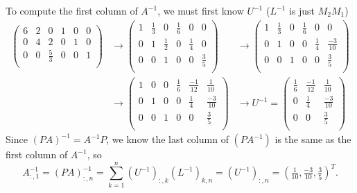 \documentclass[11pt]{article}
\begin{document}
\begin{enumerate}
\begin{enumerate}
		            To compute the first column of \(A^{-1}\), we must first know \(U^{-1}\) (\(L^{-1}\) is just \(M_2 M_1\))
		            \begin{align*}
			            \left(\begin{array}{rrr|rrr}
					                  6 & 2 & 0        & 1 & 0 & 0 \\
					                  0 & 4 & 2        & 0 & 1 & 0 \\
					                  0 & 0 & \tfrac53 & 0 & 0 & 1 \\
				                  \end{array}\right)
			             & \to
			            \left(\begin{array}{rrr|rrr}
					                  1 & \tfrac13 & 0        & \tfrac16 & 0        & 0        \\
					                  0 & 1        & \tfrac12 & 0        & \tfrac14 & 0        \\
					                  0 & 0        & 1        & 0        & 0        & \tfrac35 \\
				                  \end{array}\right)
			             & \to
			            \left(\begin{array}{rrr|rrr}
					                  1 & \tfrac13 & 0 & \tfrac16 & 0        & 0              \\
					                  0 & 1        & 0 & 0        & \tfrac14 & \tfrac{-3}{10} \\
					                  0 & 0        & 1 & 0        & 0        & \tfrac35       \\
				                  \end{array}\right) \\
			             & \to
			            \left(\begin{array}{rrr|rrr}
					                  1 & 0 & 0 & \tfrac16 & \tfrac{-1}{12} & \tfrac1{10}    \\
					                  0 & 1 & 0 & 0        & \tfrac14       & \tfrac{-3}{10} \\
					                  0 & 0 & 1 & 0        & 0              & \tfrac35       \\
				                  \end{array}\right)
			             & \to
			            U^{-1} =
			            \left(\begin{array}{rrr}
					                  \tfrac16 & \tfrac{-1}{12} & \tfrac1{10}    \\
					                  0        & \tfrac14       & \tfrac{-3}{10} \\
					                  0        & 0              & \tfrac35       \\
				                  \end{array}\right)
		            \end{align*}
		            Since \((PA)^{-1} = A^{-1}P\), we know the last column of \((PA^{-1})\) is the same as the first column of \(A^{-1}\), so
		            \[A_{:,1}^{-1} = (PA)_{:,n}^{-1} = \sum_{k=1}^n (U^{-1})_{:,k}(L^{-1})_{k,n} = (U^{-1})_{:,n} = \left(\tfrac{1}{10}, \tfrac{-3}{10}, \tfrac35\right)^T.\]


\end{enumerate}
\end{enumerate}
\end{document}
